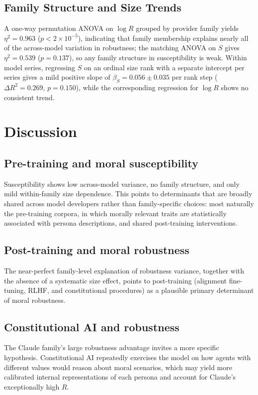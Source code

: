 \documentclass{article}
\begin{document}
\subsection{Family Structure and Size Trends}
\label{sec:family-size-trends}

A one-way permutation ANOVA on \(\log R\) grouped by provider family yields \(\eta^2 = 0.963\) (\(p < 2 \times 10^{-5}\)), indicating that family membership explains nearly all of the across-model variation in robustness; the matching ANOVA on \(S\) gives \(\eta^2 = 0.539\) (\(p = 0.137\)), so any family structure in susceptibility is weak. Within model series, regressing \(S\) on an ordinal size rank with a separate intercept per series gives a mild positive slope of \(\beta_S = 0.056 \pm 0.035\) per rank step (\(\Delta R^2 = 0.269\), \(p = 0.150\)), while the corresponding regression for \(\log R\) shows no consistent trend.

\FloatBarrier

\section{Discussion}
\label{sec:discussion}

\subsection{Pre-training and moral susceptibility}


Susceptibility shows low across-model variance, no family structure, and only mild within-family size dependence. This points to determinants that are broadly shared across model developers rather than family-specific choices: most naturally the pre-training corpora, in which morally relevant traits are statistically associated with persona descriptions, and shared post-training interventions.

\subsection{Post-training and moral robustness}

The near-perfect family-level explanation of robustness variance, together with the absence of a systematic size effect, points to post-training (alignment fine-tuning, RLHF, and constitutional procedures) as a plausible primary determinant of moral robustness.

\subsection{Constitutional AI and robustness}
The Claude family's large robustness advantage invites a more specific hypothesis. Constitutional AI \citep{bai2022constitutional} repeatedly exercises the model on how agents with different values would reason about moral scenarios, which may yield more calibrated internal representations of each persona and account for Claude's exceptionally high \(R\).
\end{document}
